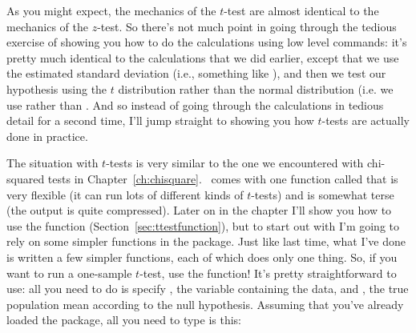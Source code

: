 
As you might expect, the mechanics of the $t$-test are almost identical to the mechanics of the $z$-test. So there's not much point in going through the tedious exercise of showing you how to do the calculations using low level commands: it's pretty much identical to the calculations that we did earlier, except that we use the estimated standard deviation (i.e., something like ), and then we test our hypothesis using the $t$ distribution rather than the normal distribution  (i.e. we use  rather than . And so instead of going through the calculations in tedious detail for a second time, I'll jump straight to showing you how $t$-tests are actually done in practice. 

The situation with $t$-tests is very similar to the one we encountered with chi-squared tests in Chapter~\ref{ch:chisquare}. \R\ comes with one function called  that is very flexible (it can run lots of different kinds of $t$-tests) and is somewhat terse (the output is quite compressed). Later on in the chapter I'll show you how to use the  function (Section~\ref{sec:ttestfunction}), but to start out with I'm going to rely on some simpler functions in the  package. Just like last time, what I've done is written a few simpler functions, each of which does only one thing. So, if you want to run a one-sample $t$-test, use the  function! It's pretty straightforward to use: all you need to do is specify , the variable containing the data, and , the true population mean according to the null hypothesis. Assuming that you've already loaded the  package, all you need to type is this:

